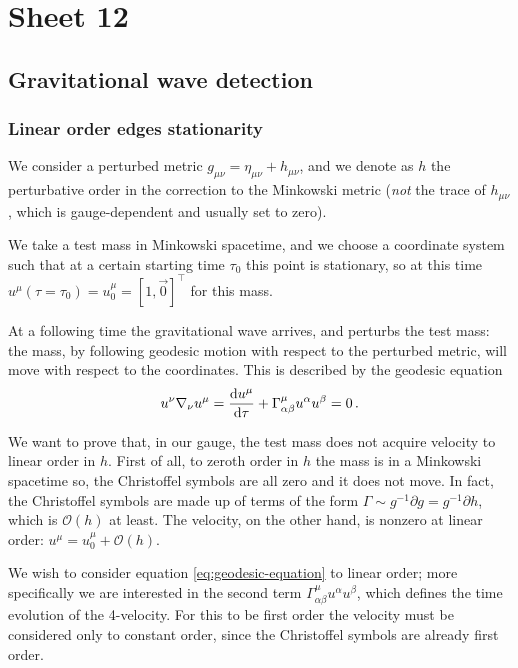 \documentclass[main.tex]{subfiles}
\begin{document}
\section{Sheet 12}

\subsection{Gravitational wave detection}

\subsubsection{Linear order edges stationarity}

We consider a perturbed metric  \(g_{\mu \nu } = \eta_{\mu \nu } + h_{\mu \nu }\), and we denote as \(h\) the perturbative order in the correction to the Minkowski metric (\emph{not} the trace of \(h_{\mu \nu }\), which is gauge-dependent and usually set to zero). 

We take a test mass in Minkowski spacetime, and we choose a coordinate system such that at a certain starting time \(\tau_0 \) this point is stationary, so at this time \(u^{\mu }(\tau = \tau_0  ) = u^{\mu }_{0} = [1, \vec{0}]^{\top}\) for this mass.

At a following time the gravitational wave arrives, and perturbs the test mass: the mass, by following geodesic motion with respect to the perturbed metric, will move with respect to the coordinates. This is described by the geodesic equation 
%
\begin{align} \label{eq:geodesic-equation}
u^{\nu } \nabla_{\nu } u^{\mu } = \dv{ u^{\mu } }{\tau } + \Gamma^{\mu }_{\alpha \beta } u^{\alpha } u^{\beta } = 0
\,.
\end{align}

We want to prove that, in our gauge, the test mass does not acquire velocity to linear order in \(h\). 
First of all, to zeroth order in \(h\) the mass is in a Minkowski spacetime so, the Christoffel symbols are all zero and it does not move. In fact, the Christoffel symbols are made up of terms of the form \(\Gamma \sim g^{-1} \partial g = g^{-1} \partial h\), which is  \(\mathcal{O}(h)\) at least. 
The velocity, on the other hand, is nonzero at linear order: \(u^{\mu } = u^{\mu }_{0} + \mathcal{O}(h)\).

We wish to consider equation \eqref{eq:geodesic-equation} to linear order; more specifically we are interested in the second term \(\Gamma^{\mu }_{\alpha \beta } u^{\alpha } u^{\beta }\), which defines the time evolution of the 4-velocity. For this to be first order the velocity must be considered only to constant order, since the Christoffel symbols are already first order. 
\end{document}
